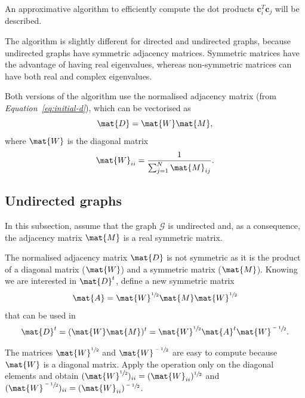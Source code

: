 \documentclass[12pt]{report}
\begin{document}
%
%


An approximative algorithm to efficiently compute the dot products $\bm{c}^T_i\bm{c}_j$
will be described.

The algorithm is slightly different for directed and undirected graphs, because
undirected graphs have symmetric adjacency matrices. Symmetric matrices have the
advantage of having real eigenvalues, whereas non-symmetric matrices can have
both real and complex eigenvalues.

Both versions of the algorithm use the normalised adjacency matrix (from
\emph{Equation~\ref{eq:initial-d}}), which can be vectorised as
\begin{equation}
  \label{eq:d-vectorised}
  \mat{D} = \mat{W}\mat{M},
\end{equation}
where $\mat{W}$ is the diagonal matrix
\begin{equation}
  \label{eq:W}
  \mat{W}_{ii} = \frac{1}{\sum_{j=1}^N \mat{M}_{ij}}.
\end{equation}

%
%

\subsection{Undirected graphs}

In this subsection, assume that the graph $\mathcal{G}$ is undirected and, as a
consequence, the adjacency matrix $\mat{M}$ is a real symmetric matrix.

The normalised adjacency matrix $\mat{D}$ is not symmetric as it is the product
of a diagonal matrix ($\mat{W}$) and a symmetric matrix ($\mat{M}$). Knowing we
are interested in $\mat{D}^t$, define a new symmetric matrix
\begin{equation}
  \label{eq:a}
  \mat{A} = \mat{W}^{\sfrac{1}{2}}\mat{M}\mat{W}^{\sfrac{1}{2}}
\end{equation}
that can be used in
\begin{align}
  \label{eq:undirected-dt-waw}
  \mat{D}^t = (\mat{W}\mat{M})^t
      = \mat{W}^{\sfrac{1}{2}} \mat{A}^t \mat{W}^{\sfrac{-1}{2}}.
\end{align}

The matrices $\mat{W}^{\sfrac{1}{2}}$ and $\mat{W}^{\sfrac{-1}{2}}$ are easy to
compute because $\mat{W}$ is a diagonal matrix. Apply the operation only on the
diagonal elements and obtain $(\mat{W}^{\sfrac{1}{2}})_{ii} = (\mat{W}_{ii})^
{\sfrac{1}{2}}$ and $(\mat{W}^{\sfrac{-1}{2}})_{ii} = (\mat{W}_{ii})^
{\sfrac{-1}{2}}$.
\end{document}

